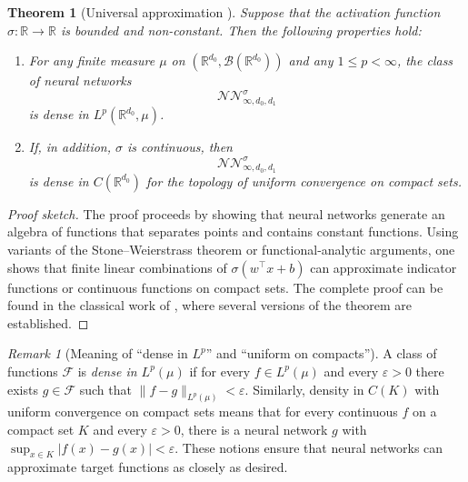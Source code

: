 \documentclass[12pt,a4paper]{article}
\theoremstyle{definition}
\theoremstyle{plain}
\newtheorem{theorem}{Theorem}[section]
\theoremstyle{remark}
\newtheorem{remark}{Remark}[section]
\theoremstyle{plain}
\begin{document}
\begin{theorem}[Universal approximation \cite{Hornik1991}]
\label{thm:universal_approx_new}
Suppose that the activation function $\sigma:\mathbb{R}\to\mathbb{R}$ is bounded and non-constant.  
Then the following properties hold:

\begin{enumerate}
    \item For any finite measure $\mu$ on $(\mathbb{R}^{d_0},\mathcal{B}(\mathbb{R}^{d_0}))$ and any $1 \le p < \infty$, the class of neural networks
    \[
        \mathcal{NN}^{\sigma}_{\infty,d_0,d_1}
    \]
    is dense in $L^p(\mathbb{R}^{d_0},\mu)$.

    \item If, in addition, $\sigma$ is continuous, then  
    \[
        \mathcal{NN}^{\sigma}_{\infty,d_0,d_1}
    \]
    is dense in $C(\mathbb{R}^{d_0})$ for the topology of uniform convergence on compact sets.
\end{enumerate}
\end{theorem}

\begin{proof}[Proof sketch]
The proof proceeds by showing that neural networks generate an algebra of functions that separates points and contains constant functions. 
Using variants of the Stone–Weierstrass theorem or functional-analytic arguments, one shows that finite linear combinations of $\sigma(w^\top x + b)$ can approximate indicator functions or continuous functions on compact sets. 
The complete proof can be found in the classical work of \cite{Hornik1991}, where several versions of the theorem are established.
\end{proof}

\begin{remark}[Meaning of ``dense in $L^p$'' and ``uniform on compacts'']\label{rem:density}
A class of functions $\mathcal{F}$ is \emph{dense in $L^p(\mu)$} if for every $f\in L^p(\mu)$ and every $\varepsilon>0$ there exists $g\in\mathcal{F}$ such that $\|f-g\|_{L^p(\mu)}<\varepsilon$. 
Similarly, density in $C(K)$ with uniform convergence on compact sets means that for every continuous $f$ on a compact set $K$ and every $\varepsilon>0$, there is a neural network $g$ with $\sup_{x\in K}|f(x)-g(x)|<\varepsilon$. 
These notions ensure that neural networks can approximate target functions as closely as desired.
\end{remark}
\end{document}
